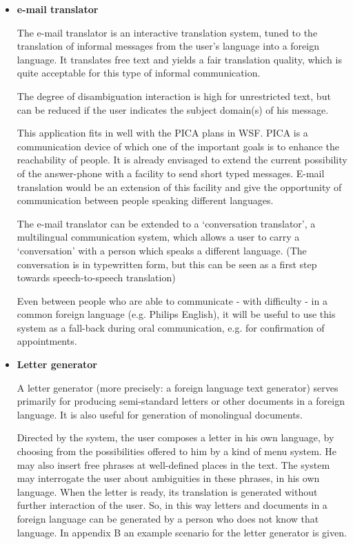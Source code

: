 \begin{itemize}


\item {\bf e-mail translator } 

The e-mail translator is an interactive translation system, tuned to the 
translation of informal messages from the user's language into a foreign 
language. It translates free text and yields a fair translation quality,
which is quite acceptable 
for this type of informal communication.


The degree of disambiguation interaction is high for unrestricted text, but can 
be reduced if the user indicates the subject domain(s) of his message.


This application fits in well with the PICA plans in WSF. PICA is
a communication device of which one of the important goals is to
enhance the reachability of people.
It is already envisaged to extend the current possibility of the answer-phone
with a facility to send short typed messages. E-mail translation would be an 
extension of this facility and give the opportunity of communication 
between people speaking different languages. 

The e-mail translator can be extended to  a 
`conversation translator', a
multilingual communication system, 
which allows a user to carry a 
`conversation' with a person which speaks a different 
language. (The conversation is in typewritten form, but this 
can be seen as a first step towards speech-to-speech 
translation)

Even between people who are able to communicate - with difficulty - in 
a common foreign language
(e.g. Philips English),
it will be useful to use this system as a fall-back during oral communication,
e.g. for  confirmation of appointments.

\bigskip


\item {\bf Letter generator}

A letter generator (more precisely: a foreign language text generator) 
serves primarily for producing semi-standard letters or other 
documents in a foreign language. It is also useful for generation of 
monolingual documents.

Directed by the system, the user composes a letter in his own language, by
choosing from the possibilities offered to him by a kind of menu system. 
He may also insert free 
phrases at well-defined places in the text. The system may interrogate the
user about ambiguities in these 
phrases, in his own language. 
When
the letter is ready, its translation is generated without further
interaction of the user.
So, in this way 
letters and documents in a foreign 
language can be generated by a person who does not know that language.
In appendix B an example scenario for the letter generator is given.


\end{itemize}
